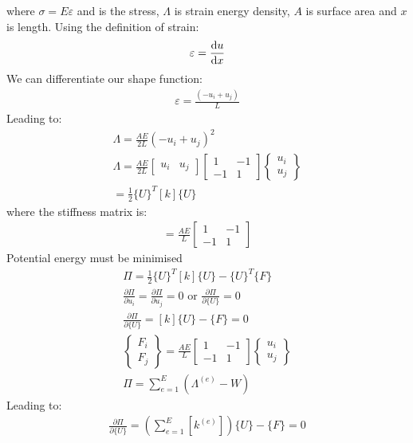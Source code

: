 where $\sigma = E\varepsilon$ and is the stress, $\Lambda$ is strain energy density, $A$ is surface area and $x$ is length. Using the definition of strain:
\begin{gather}
	\varepsilon = \frac{\dif u}{\dif x}
\end{gather}
We can differentiate our shape function:
\begin{gather}
	\varepsilon = \frac{\left(-u_i + u_j\right)}{L}
\end{gather}
Leading to:
\begin{gather}
	\Lambda = \frac{AE}{2L}\left(-u_i + u_j\right)^2\\
	\Lambda = \frac{AE}{2L}\begin{bmatrix}
		u_i & u_j
	\end{bmatrix}\begin{bmatrix}
		1 & -1\\
		-1 & 1
	\end{bmatrix}\begin{Bmatrix}
		u_i\\
		u_j
	\end{Bmatrix}\\
	= \frac{1}{2}\{U\}^T[k]\{U\}
\end{gather}
where the stiffness matrix is:
\begin{gather}
	[k] = \frac{AE}{L}\begin{bmatrix}
		1 & -1\\
		-1 & 1
	\end{bmatrix}
\end{gather}
Potential energy must be minimised
\begin{gather}
	\Pi = \frac{1}{2}\{U\}^T [k]\{U\} - \{U\}^T \{F\}\\
	\frac{\partial \Pi}{\partial u_i} = \frac{\partial \Pi}{\partial u_j} = 0 \textrm{ or } \frac{\partial \Pi}{\partial \{U\}} = 0\\
	\frac{\partial \Pi}{\partial \{U\}} = [k]\{U\} - \{F\} = 0\\
	\begin{Bmatrix}
		F_i\\
		F_j
	\end{Bmatrix} = \frac{AE}{L}\begin{bmatrix}
		1 & -1\\
		-1 & 1
	\end{bmatrix}\begin{Bmatrix}
		u_i\\
		u_j
	\end{Bmatrix}\\
	\Pi = \sum^E_{e=1}\left(\Lambda^{\left(e\right)}-W\right)
\end{gather}
Leading to:
\begin{gather}
	\frac{\partial \Pi}{\partial\{U\}} = \left(\sum^E_{e=1}\left[k^{\left(e\right)}\right]\right)\{U\}-\{F\} = 0
\end{gather}
